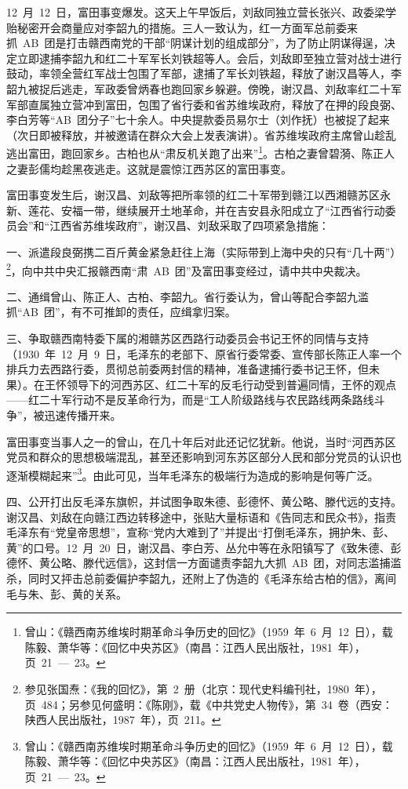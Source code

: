 12~月~12~日，富田事变爆发。这天上午早饭后，刘敌同独立营长张兴、政委梁学贻秘密开会商量应对李韶九的措施。三人一致认为，红一方面军总前委来抓~AB~团是打击赣西南党的干部“阴谋计划的组成部分”，为了防止阴谋得逞，决定立即逮捕李韶九和红二十军军长刘铁超等人。会后，刘敌即至独立营对战士进行鼓动，率领全营红军战士包围了军部，逮捕了军长刘铁超，释放了谢汉昌等人，李韶九被捉后逃走，军政委曾炳春也跑回家乡躲避。傍晚，谢汉昌、刘敌率红二十军军部直属独立营冲到富田，包围了省行委和省苏维埃政府，释放了在押的段良弼、李白芳等“AB~团分子”七十余人。中央提款委员易尔士（刘作抚）也被捉了起来（次日即被释放，并被邀请在群众大会上发表演讲）。省苏维埃政府主席曾山趁乱逃出富田，跑回家乡。古柏也从“肃反机关跑了出来”\footnote{曾山：《赣西南苏维埃时期革命斗争历史的回忆》（1959~年~6~月~12~日），载陈毅、萧华等：《回忆中央苏区》（南昌：江西人民出版社，1981~年），页~21~—~23。}。古柏之妻曾碧漪、陈正人之妻彭儒均趁黑夜逃走。这就是震惊江西苏区的富田事变。

富田事变发生后，谢汉昌、刘敌等把所率领的红二十军带到赣江以西湘赣苏区永新、莲花、安福一带，继续展开土地革命，并在吉安县永阳成立了“江西省行动委员会”和“江西省苏维埃政府”，谢汉昌、刘敌采取了四项紧急措施：

一、派遣段良弼携二百斤黄金紧急赶往上海（实际带到上海中央的只有“几十两”）\footnote{参见张国焘：《我的回忆》，第~2~册（北京：现代史料编刊社，1980~年），页~484；另参见何盛明：《陈刚》，载《中共党史人物传》，第~34~卷（西安：陕西人民出版社，1987~年），页~211。}，向中共中央汇报赣西南“肃~AB~团”及富田事变经过，请中共中央裁决。

二、通缉曾山、陈正人、古柏、李韶九。省行委认为，曾山等配合李韶九滥抓“AB~团”，有不可推卸的责任，应缉拿归案。

三、争取赣西南特委下属的湘赣苏区西路行动委员会书记王怀的同情与支持（1930~年~12~月~9~日，毛泽东的老部下、原省行委常委、宣传部长陈正人率一个排兵力去西路行委，贯彻总前委两封信的精神，准备逮捕行委书记王怀，但未果）。在王怀领导下的河西苏区、红二十军的反毛行动受到普遍同情，王怀的观点——红二十军行动不是反革命行为，而是“工人阶级路线与农民路线两条路线斗争”，被迅速传播开来。

富田事变当事人之一的曾山，在几十年后对此还记忆犹新。他说，当时“河西苏区党员和群众的思想极端混乱，甚至还影响到河东苏区部分人民和部分党员的认识也逐渐模糊起来”\footnote{曾山：《赣西南苏维埃时期革命斗争历史的回忆》（1959~年~6~月~12~日），载陈毅、萧华等：《回忆中央苏区》（南昌：江西人民出版社，1981~年），页~21~—~23。}。由此可见，当年毛泽东的极端行为造成的影响是何等广泛。

四、公开打出反毛泽东旗帜，并试图争取朱德、彭德怀、黄公略、滕代远的支持。谢汉昌、刘敌在向赣江西边转移途中，张贴大量标语和《告同志和民众书》，指责毛泽东有“党皇帝思想”，宣称“党内大难到了”并提出“打倒毛泽东，拥护朱、彭、黄”的口号。12~月~20~日，谢汉昌、李白芳、丛允中等在永阳镇写了《致朱德、彭德怀、黄公略、滕代远信》，这封信一方面谴责李韶九大抓~AB~团，对同志滥捕滥杀，同时又抨击总前委偏护李韶九，还附上了伪造的《毛泽东给古柏的信》，离间毛与朱、彭、黄的关系。


